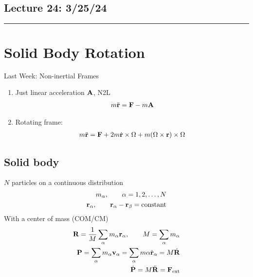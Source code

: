 \documentclass[../main.tex]{subfiles}
\begin{document}
\subsection*{Lecture 24: \hfill  3/25/24}
\hrule \vspace{10px}
\section{Solid Body Rotation}

Last Week: Non-inertial Frames
\begin{enumerate}
    \item Just linear acceleration $\vb A$, N2L 
    \begin{align*}
        m \ddot{\vb r} = \vb F - m \vb A
    \end{align*}
    \item Rotating frame: 
    \begin{align*}
        m\ddot{\vb r} = \vb F + 2m\dot{\vb r} \times \Omega + m(\Omega \times \vb r) \times \Omega
    \end{align*}
\end{enumerate}

\subsection*{Solid body} $N$ particles on a continuous distribution
\begin{align*}
    m_\alpha, \qquad \alpha = 1, 2, \dots, N \\
    \vb r_\alpha, \qquad \vb r_\alpha - \vb r_\beta = \text{constant}
\end{align*}
With a center of mass (COM/CM)
\begin{align*}
    \vb R = \frac{1}{M} \sum_\alpha m_\alpha \vb r_\alpha, \qquad M = \sum_\alpha m_\alpha \\
    \vb P = \sum_\alpha m_\alpha \vb v_\alpha = \sum_\alpha m\alpha \dot{\vb r}_\alpha = M \dot{\vb R} \\
    \dot{\vb P} = M \ddot{\vb R} = \vb F_{\text{ext}} 
\end{align*}
\end{document}
